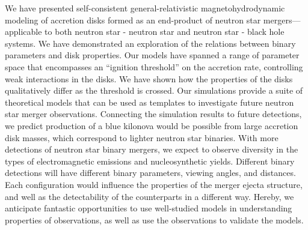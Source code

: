 We have presented self-consistent general-relativistic magnetohydrodynamic modeling of accretion disks formed as an end-product of neutron star mergers---applicable to both neutron star - neutron star and neutron star - black hole systems. We have demonstrated an exploration of the relations between binary parameters and disk properties. Our models have spanned a range of parameter space that encompasses an ``ignition threshold'' on the accretion rate, controlling weak interactions in the disks. We have shown how the properties of the disks qualitatively differ as the threshold is crossed. Our simulations provide a suite of theoretical models that can be used as templates to investigate future neutron star merger observations. Connecting the simulation results to future detections, we predict production of a blue kilonova would be possible from large accretion disk masses, which correspond to lighter neutron star binaries. With more detections of neutron star binary mergers, we expect to observe diversity in the types of electromagnetic emissions and nucleosynthetic yields. Different binary detections will have different binary parameters, viewing angles, and distances. Each configuration would influence the properties of the merger ejecta structure, and well as the detectability of the counterparts in a different way. Hereby, we anticipate fantastic opportunities to use well-studied models in understanding properties of observations, as well as use the observations to validate the models.